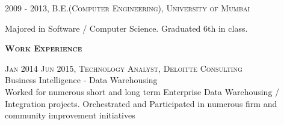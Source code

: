 \documentclass[letterpaper,12pt,final]{memoir}
\newcommand{\SmallSep}{\vspace{0.5em}}
\newcommand{\CVSection}[1]
	{\Large\textbf{\textsc{{#1}}}\par
	\SmallSep\normalsize\normalfont}
\newcommand{\CVItem}[1]
	{\textsc{\color{Plum} #1}}
\begin{document}
\CVItem{2009 - 2013, B.E.(Computer Engineering), University of \allowbreak  Mumbai}\\
 \begin{footnotesize}
 	Majored in Software / Computer Science. Graduated 6th in class.
 \end{footnotesize}
\SmallSep

\CVSection{Work Experience}
\CVItem{Jan 2014 \textendash \space Jun 2015, Technology Analyst, Deloitte Consulting}\\
\SmallSep
Business Intelligence - Data Warehousing\\
{\footnotesize Worked for numerous short and long term Enterprise Data Warehousing / Integration projects. Orchestrated and Participated in numerous firm and community improvement initiatives}
\SmallSep
\end{document}

